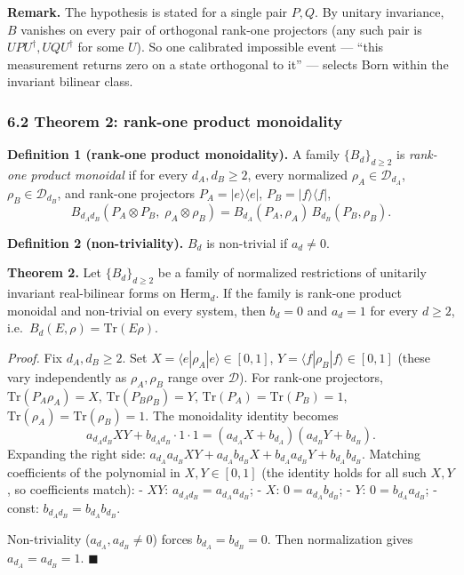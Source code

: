 \documentclass[
]{article}
\begin{document}
\textbf{Remark.} The hypothesis is stated for a single pair \(P,Q\). By
unitary invariance, \(B\) vanishes on every pair of orthogonal rank-one
projectors (any such pair is \(UPU^\dagger,UQU^\dagger\) for some
\(U\)). So one calibrated impossible event --- ``this measurement
returns zero on a state orthogonal to it'' --- selects Born within the
invariant bilinear class.

\subsubsection{6.2 Theorem 2: rank-one product
monoidality}\label{theorem-2-rank-one-product-monoidality}

\textbf{Definition 1 (rank-one product monoidality).} A family
\(\{B_d\}_{d\geq 2}\) is \emph{rank-one product monoidal} if for every
\(d_A,d_B\geq 2\), every normalized \(\rho_A\in\mathcal D_{d_A}\),
\(\rho_B\in\mathcal D_{d_B}\), and rank-one projectors
\(P_A=|e\rangle\langle e|\), \(P_B=|f\rangle\langle f|\),
\[B_{d_Ad_B}(P_A\otimes P_B,\;\rho_A\otimes\rho_B) = B_{d_A}(P_A,\rho_A)\,B_{d_B}(P_B,\rho_B).\]

\textbf{Definition 2 (non-triviality).} \(B_d\) is non-trivial if
\(a_d\neq 0\).

\textbf{Theorem 2.} Let \(\{B_d\}_{d\geq 2}\) be a family of normalized
restrictions of unitarily invariant real-bilinear forms on
\(\mathrm{Herm}_d\). If the family is rank-one product monoidal and
non-trivial on every system, then \(b_d=0\) and \(a_d=1\) for every
\(d\geq 2\), i.e.~\(B_d(E,\rho)=\mathrm{Tr}(E\rho)\).

\emph{Proof.} Fix \(d_A,d_B\geq 2\). Set
\(X=\langle e|\rho_A|e\rangle\in[0,1]\),
\(Y=\langle f|\rho_B|f\rangle\in[0,1]\) (these vary independently as
\(\rho_A,\rho_B\) range over \(\mathcal D\)). For rank-one projectors,
\(\mathrm{Tr}(P_A\rho_A)=X\), \(\mathrm{Tr}(P_B\rho_B)=Y\),
\(\mathrm{Tr}(P_A)=\mathrm{Tr}(P_B)=1\),
\(\mathrm{Tr}(\rho_A)=\mathrm{Tr}(\rho_B)=1\). The monoidality identity
becomes
\[a_{d_Ad_B}XY + b_{d_Ad_B}\cdot 1\cdot 1 = (a_{d_A}X+b_{d_A})(a_{d_B}Y+b_{d_B}).\]
Expanding the right side:
\(a_{d_A}a_{d_B}XY+a_{d_A}b_{d_B}X+b_{d_A}a_{d_B}Y+b_{d_A}b_{d_B}\).
Matching coefficients of the polynomial in \(X,Y\in[0,1]\) (the identity
holds for all such \(X,Y\), so coefficients match): - \(XY\):
\(a_{d_Ad_B}=a_{d_A}a_{d_B}\); - \(X\): \(0=a_{d_A}b_{d_B}\); - \(Y\):
\(0=b_{d_A}a_{d_B}\); - const: \(b_{d_Ad_B}=b_{d_A}b_{d_B}\).

Non-triviality (\(a_{d_A},a_{d_B}\neq 0\)) forces \(b_{d_A}=b_{d_B}=0\).
Then normalization gives \(a_{d_A}=a_{d_B}=1\). \(\blacksquare\)
\end{document}
